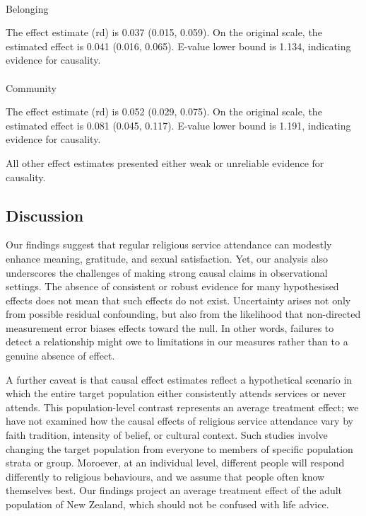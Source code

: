 \documentclass[
  single column]{article}
\makeatletter
\let\oldparagraph\paragraph
\renewcommand{\paragraph}{
    \@ifstar
      \xxxParagraphStar
      \xxxParagraphNoStar
  }
\newcommand{\xxxParagraphStar}[1]{\oldparagraph*{#1}\mbox{}}
\newcommand{\xxxParagraphNoStar}[1]{\oldparagraph{#1}\mbox{}}
\makeatother
\begin{document}
\paragraph{Belonging}\label{belonging}

The effect estimate (rd) is 0.037 (0.015, 0.059). On the original scale,
the estimated effect is 0.041 (0.016, 0.065). E-value lower bound is
1.134, indicating evidence for causality.

\paragraph{Community}\label{community}

The effect estimate (rd) is 0.052 (0.029, 0.075). On the original scale,
the estimated effect is 0.081 (0.045, 0.117). E-value lower bound is
1.191, indicating evidence for causality.

All other effect estimates presented either weak or unreliable evidence
for causality.

\newpage{}

\subsection{Discussion}\label{discussion}

Our findings suggest that regular religious service attendance can
modestly enhance meaning, gratitude, and sexual satisfaction. Yet, our
analysis also underscores the challenges of making strong causal claims
in observational settings. The absence of consistent or robust evidence
for many hypothesised effects does not mean that such effects do not
exist. Uncertainty arises not only from possible residual confounding,
but also from the likelihood that non-directed measurement error biases
effects toward the null. In other words, failures to detect a
relationship might owe to limitations in our measures rather than to a
genuine absence of effect.

A further caveat is that causal effect estimates reflect a hypothetical
scenario in which the entire target population either consistently
attends services or never attends. This population-level contrast
represents an average treatment effect; we have not examined how the
causal effects of religious service attendance vary by faith tradition,
intensity of belief, or cultural context. Such studies involve changing
the target population from everyone to members of specific population
strata or group. Moroever, at an individual level, different people will
respond differently to religious behaviours, and we assume that people
often know themselves best. Our findings project an average treatment
effect of the adult population of New Zealand, which should not be
confused with life advice.
\end{document}
